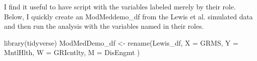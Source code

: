 \documentclass[
  11pt,
]{book}
\newenvironment{Shaded}{\begin{snugshade}}{\end{snugshade}}
\newcommand{\AttributeTok}[1]{\textcolor[rgb]{0.77,0.63,0.00}{#1}}
\newcommand{\FunctionTok}[1]{\textcolor[rgb]{0.00,0.00,0.00}{#1}}
\newcommand{\NormalTok}[1]{#1}
\newcommand{\OtherTok}[1]{\textcolor[rgb]{0.56,0.35,0.01}{#1}}
\begin{document}
I find it useful to have script with the variables labeled merely by their role. Below, I quickly create an ModMeddemo\_df from the Lewis et al. \citep{lewis_applying_2017} simulated data and then run the analysis with the variables named in their roles.

\begin{Shaded}
\begin{Highlighting}[]
\FunctionTok{library}\NormalTok{(tidyverse)}
\NormalTok{ModMedDemo\_df }\OtherTok{\textless{}{-}} \FunctionTok{rename}\NormalTok{(Lewis\_df, }\AttributeTok{X =}\NormalTok{ GRMS, }\AttributeTok{Y =}\NormalTok{ MntlHlth, }\AttributeTok{W =}\NormalTok{ GRIcntlty, }\AttributeTok{M =}\NormalTok{ DisEngmt )}
\end{Highlighting}
\end{Shaded}
\end{document}
